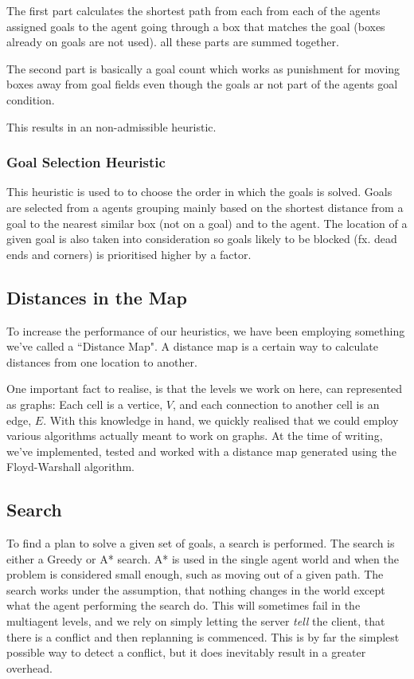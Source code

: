 \documentclass[letterpaper]{article}
\begin{document}
			The first part calculates the shortest path from each from each of the agents assigned goals to the agent going through a box that matches the goal (boxes already on goals are not used). all these parts are summed together.
			
			The second part is basically a goal count which works as punishment for moving boxes away from goal fields even though the goals ar not part of the agents goal condition.
			
			This results in an non-admissible heuristic.
		
		\subsubsection{Goal Selection Heuristic}\label{goal2}
			This heuristic is used to to choose the order in which the goals is solved. Goals are selected from a agents grouping mainly based on the shortest distance from a goal to the nearest similar box (not on a goal) and to the agent. The location of a given goal is also taken into consideration so goals likely to be blocked (fx. dead ends and corners) is prioritised higher by a factor.

				
			
	\subsection{Distances in the Map}
		To increase the performance of our heuristics, we have been employing something we've called a ``Distance Map". A distance map is a certain way to calculate distances from one location to another.
			
		One important fact to realise, is that the levels we work on here, can represented as graphs: Each cell is a vertice, $V$, and each connection to another cell is an edge, $E$. With this knowledge in hand, we quickly realised that we could employ various algorithms actually meant to work on graphs. At the time of writing, we've implemented, tested and worked with a distance map generated using the Floyd-Warshall algorithm.

	\subsection{Search}
		To find a plan to solve a given set of goals, a search is performed. The search is either a Greedy or A* search. A* is used in the single agent world and when the problem is considered small enough, such as moving out of a given path. 
		The search works under the assumption, that nothing changes in the world except what the agent performing the search do. This will sometimes fail in the multiagent levels, and we rely on simply letting the server \emph{tell} the client, that there is a conflict and then replanning is commenced. This is by far the simplest possible way to detect a conflict, but it does inevitably result in a greater overhead. 
		
\end{document}
